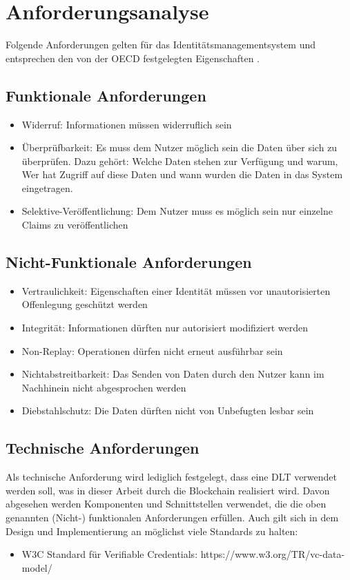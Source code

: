 \chapter{Anforderungsanalyse}
\label{cha:anforderungsanalyse}
Folgende Anforderungen gelten für das Identitätsmanagementsystem und entsprechen den von der OECD festgelegten Eigenschaften \cite{ID25} \cite{ID26}.
\section{Funktionale Anforderungen}

\begin{itemize}
	\item Widerruf: Informationen müssen widerruflich sein
	\item Überprüfbarkeit: Es muss dem Nutzer möglich sein die Daten über sich zu überprüfen. Dazu gehört: Welche Daten stehen zur Verfügung und warum, Wer hat Zugriff auf diese Daten und wann wurden die Daten in das System eingetragen.
	\item Selektive-Veröffentlichung: Dem Nutzer muss es möglich sein nur einzelne Claims zu veröffentlichen
\end{itemize}

\section{Nicht-Funktionale Anforderungen}

\begin{itemize}
	\item Vertraulichkeit: Eigenschaften einer Identität müssen vor unautorisierten Offenlegung geschützt werden
	\item Integrität: Informationen dürften nur autorisiert modifiziert werden
	\item Non-Replay: Operationen dürfen nicht erneut ausführbar sein
	\item Nichtabstreitbarkeit: Das Senden von Daten durch den Nutzer kann im Nachhinein nicht abgesprochen werden
	\item Diebstahlschutz: Die Daten dürften nicht von Unbefugten lesbar sein
	
\end{itemize}

\section{Technische Anforderungen}
Als technische Anforderung wird lediglich festgelegt, dass eine DLT verwendet werden soll, was in dieser Arbeit durch die Blockchain realisiert wird. Davon abgesehen werden Komponenten und Schnittstellen verwendet, die die oben genannten (Nicht-) funktionalen Anforderungen erfüllen.
Auch gilt sich in dem Design und Implementierung an möglichst viele Standards zu halten:
\begin{itemize}
	\item W3C Standard für Verifiable Credentials: https://www.w3.org/TR/vc-data-model/
\end{itemize}

